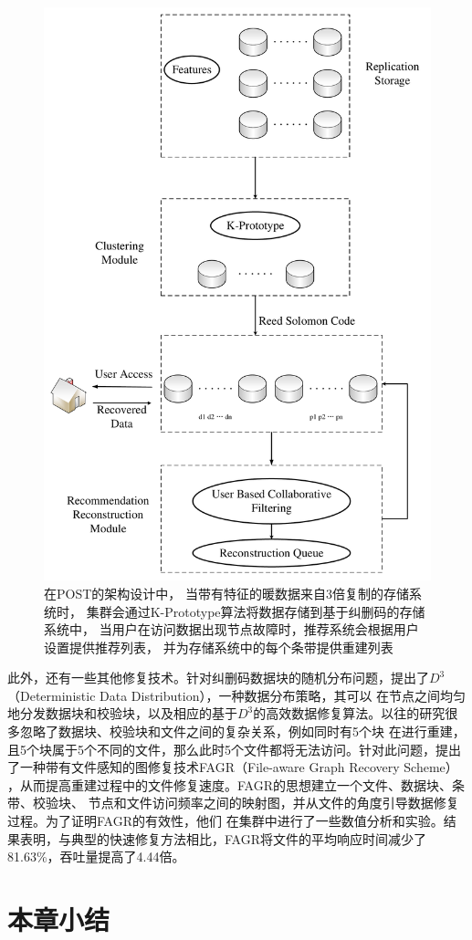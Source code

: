 \begin{figure}[tb!]
	\centering
	\includegraphics [scale=0.2]{figures/2.5.pdf}
	\caption{在POST的架构设计中，
		当带有特征的暖数据来自3倍复制的存储系统时，
		集群会通过K-Prototype算法将数据存储到基于纠删码的存储系统中，
		当用户在访问数据出现节点故障时，推荐系统会根据用户设置提供推荐列表，
		并为存储系统中的每个条带提供重建列表}
	\label{fig:con-2.5}
\end{figure}

此外，还有一些其他修复技术。针对纠删码数据块的随机分布问题，\citet{xu2020deterministic}提出了$D^3$（Deterministic Data Distribution），一种数据分布策略，其可以
在节点之间均匀地分发数据块和校验块，以及相应的基于$D^3$的高效数据修复算法。以往的研究很多忽略了数据块、校验块和文件之间的复杂关系，例如同时有5个块
在进行重建，且5个块属于5个不同的文件，那么此时5个文件都将无法访问。针对此问题，\citet{zeng2020fagr}提出了一种带有文件感知的图修复技术FAGR（File-aware Graph Recovery Scheme）
，从而提高重建过程中的文件修复速度。FAGR的思想建立一个文件、数据块、条带、校验块、
节点和文件访问频率之间的映射图，并从文件的角度引导数据修复过程。为了证明FAGR的有效性，他们
在集群中进行了一些数值分析和实验。结果表明，与典型的快速修复方法相比，FAGR将文件的平均响应时间减少了81.63\%，吞吐量提高了4.44倍。


\section{本章小结}
